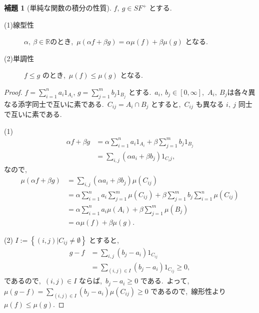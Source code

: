 \documentclass[a4j,11pt]{jarticle}
\theoremstyle{definition}
\newtheorem{lemma}[theorem]{補題}
\begin{document}
\begin{lemma}[単純な関数の積分の性質]\label{lemma:int_nature}
  $f,\ g \in SF^+$
  とする.\ 
  \begin{description}
    \item[(1)線型性]
      $\alpha,\ \beta \in \mathbb{R}$のとき,\ 
      $\mu(\alpha f + \beta g) = \alpha \mu(f) + \beta \mu(g)$
      となる.\ 
    \item[(2)単調性]
      $f \leq g$
      のとき,\ 
      $\mu(f) \leq \mu(g)$
      となる.\ 
  \end{description}
\end{lemma}

\begin{proof}
  $f = \sum_{i=1}^n a_i 1_{A_i}$, 
  $g = \sum_{j=1}^m b_j 1_{B_j}$
  とする.\ 
  $a_i,\ b_j \in \left[ 0, \infty\right]$,\ 
  $A_i,\ B_j$は各々異なる添字同士で互いに素である.\ 
  $C_{ij} = A_i \cap B_j$
  とすると,\ 
  $C_{ij}$
  も異なる
  $i,\ j$
  同士で互いに素である.\ 

  (1)
  \begin{align}
    \alpha f + \beta g
    & = \alpha \sum_{i=1}^n a_i 1_{A_i} + \beta \sum_{j=1}^m b_j 1_{B_j} \\
    & = \sum_{i,j} \left( \alpha a_i + \beta b_j \right) 1_{C_ij},
  \end{align}
  なので,\ 
  \begin{align}
    \mu(\alpha f + \beta g)
    & = \sum_{i,j} \left( \alpha a_i + \beta b_j\right) \mu(C_{ij}) \\
    & = \alpha \sum_{i=1}^n a_i \sum_{j=1}^m \mu(C_{ij}) + \beta \sum_{j=1}^m b_j \sum_{i=1}^n \mu(C_{ij}) \\
    & = \alpha \sum_{i=1}^n a_i \mu(A_i) + \beta \sum_{j=1}^m \mu(B_j) \\
    & = \alpha \mu(f) + \beta \mu(g).
  \end{align}

  (2)
  $I := \left\{(i,j) | C_{ij} \neq \emptyset \right\}$
  とすると,\ 
  \begin{align}
    g- f
    & = \sum_{i,j} (b_j - a_i) 1_{C_{ij}} \\
    & = \sum_{(i,j) \in I} (b_j - a_i) 1_{C_{ij}} \geq 0,
  \end{align}
  であるので,\ 
  $(i,j) \in I$
  ならば,\ 
  $b_j - a_i \geq 0$
  である.\ 
  よって,\ 
  $\mu(g-f) = \sum_{(i,j) \in I} (b_j-a_i) \mu(C_{ij}) \geq 0$
  であるので,\ 線形性より
  $\mu(f) \leq \mu(g)$.
\end{proof}
\end{document}
